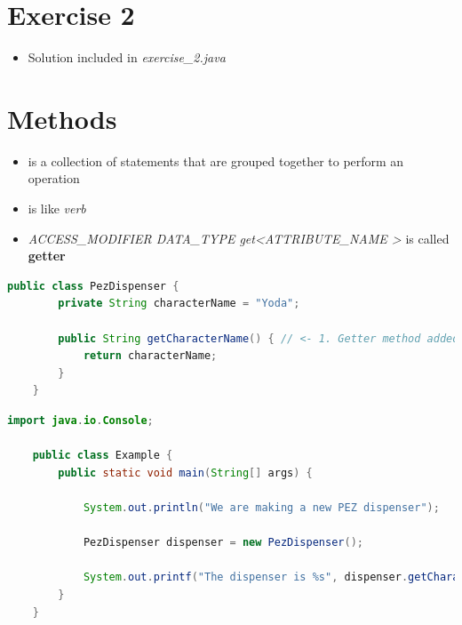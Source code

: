 \documentclass[12pt]{article}
\begin{document}
\bigskip

\section{Exercise 2}

\bigskip

\begin{itemize}
    \item Solution included in \textit{exercise\_2.java}
\end{itemize}

\bigskip

\section{Methods}

\bigskip

\begin{itemize}
    \item is a collection of statements that are grouped together to perform an
    operation
    \item is like \textit{verb}
    \item \textit{ACCESS\_MODIFIER DATA\_TYPE get\textless ATTRIBUTE\_NAME \textgreater}
    is called \textbf{getter}
\end{itemize}

\bigskip

\begin{lstlisting}[language=Java,caption={lesson\_7/PezDispenser.java}]
    public class PezDispenser {
        private String characterName = "Yoda";

        public String getCharacterName() { // <- 1. Getter method added here
            return characterName;
        }
    }
    \end{lstlisting}

    \bigskip

    \begin{lstlisting}[language=Java,caption={lesson\_7/Example.java}]
    import java.io.Console;

    public class Example {
        public static void main(String[] args) {

            System.out.println("We are making a new PEZ dispenser");

            PezDispenser dispenser = new PezDispenser();

            System.out.printf("The dispenser is %s", dispenser.getCharacterName()); // <- 2. And is used here
        }
    }
    \end{lstlisting}
\end{document}
